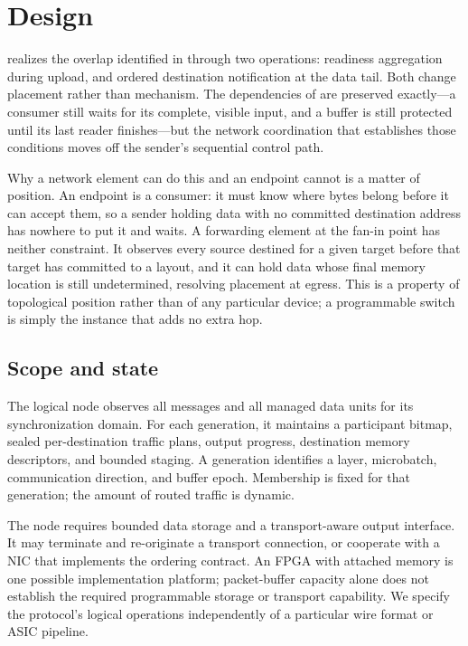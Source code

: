 \section{\sys{} Design}
\label{sec:design}
\sys{} realizes the overlap identified in  through two operations:
readiness aggregation during upload, and ordered destination notification at the data
tail. Both change placement rather than mechanism. The dependencies of
 are preserved exactly---a consumer still waits for its
complete, visible input, and a buffer is still protected until its last reader
finishes---but the network coordination that establishes those conditions moves off the
sender's sequential control path.

Why a network element can do this and an endpoint cannot is a matter of position. An
endpoint is a consumer: it must know where bytes belong before it can accept them, so a
sender holding data with no committed destination address has nowhere to put it and
waits. A forwarding element at the fan-in point has neither constraint. It observes
every source destined for a given target before that target has committed to a layout,
and it can hold data whose final memory location is still undetermined, resolving
placement at egress. This is a property of topological position rather than of any
particular device; a programmable switch is simply the instance that adds no extra hop.

\subsection{Scope and state}
The logical \sys{} node observes all \ready{} messages and all managed data units for its synchronization domain. For each generation, it maintains a participant bitmap, sealed per-destination traffic plans, output progress, destination memory descriptors, and bounded staging. A generation identifies a layer, microbatch, communication direction, and buffer epoch. Membership is fixed for that generation; the amount of routed traffic is dynamic.

The node requires bounded data storage and a transport-aware output interface. It may terminate and re-originate a transport connection, or cooperate with a NIC that implements the ordering contract. An FPGA with attached memory is one possible implementation platform; packet-buffer capacity alone does not establish the required programmable storage or transport capability. We specify the protocol's logical operations independently of a particular wire format or ASIC pipeline.

